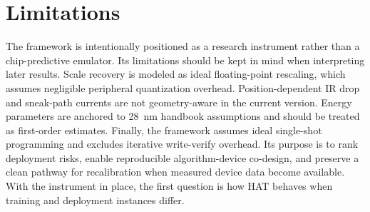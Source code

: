 \section{Limitations}

The framework is intentionally positioned as a research instrument rather than a chip-predictive emulator. Its limitations should be kept in mind when interpreting later results. Scale recovery is modeled as ideal floating-point rescaling, which assumes negligible peripheral quantization overhead. Position-dependent IR drop and sneak-path currents are not geometry-aware in the current version. Energy parameters are anchored to 28~nm handbook assumptions and should be treated as first-order estimates. Finally, the framework assumes ideal single-shot programming and excludes iterative write-verify overhead. Its purpose is to rank deployment risks, enable reproducible algorithm-device co-design, and preserve a clean pathway for recalibration when measured device data become available. With the instrument in place, the first question is how HAT behaves when training and deployment instances differ.
